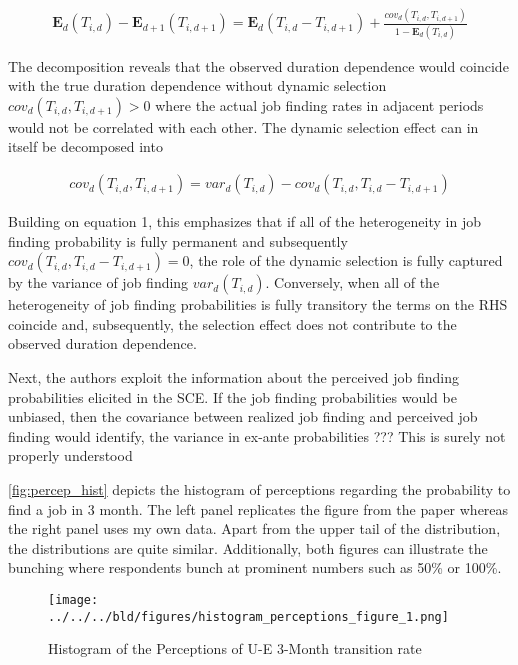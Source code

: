 \documentclass[11pt,a4paper,leqno]{article}
\begin{document}
\begin{align}
	\mathbf{E}_d (T_{i,d}) - \mathbf{E}_{d+1} (T_{i,d+1}) = \mathbf{E}_d (T_{i,d} - T_{i,d+1}) + \frac{cov_d (T_{i,d},T_{i,d+1})}{1 - \mathbf{E}_d (T_{i,d})}
\end{align}

The decomposition reveals that the observed duration dependence would coincide with the true duration dependence without dynamic selection $cov_d (T_{i,d},T_{i,d+1}) > 0$ where the actual  job finding rates in adjacent periods would not be correlated with each other. The dynamic selection effect can in itself be decomposed into 

\begin{align}
	cov_d (T_{i,d},T_{i,d+1}) = var_d (T_{i,d}) -  cov_d (T_{i,d},T_{i,d} - T_{i,d+1})
\end{align}

Building on equation 1, this emphasizes that if all of the heterogeneity in job finding probability is fully permanent  and subsequently $cov_d (T_{i,d},T_{i,d} - T_{i,d+1}) = 0$, the role of the dynamic selection is fully captured by the variance of job finding $var_d (T_{i,d})$. Conversely, when all of the heterogeneity of job finding probabilities is fully transitory the terms on the RHS coincide and, subsequently, the selection effect does not contribute to the observed duration dependence. 

Next, the authors exploit the information about the perceived job finding probabilities elicited in the SCE. If the job finding probabilities would be unbiased, then the covariance between realized job finding and  perceived job finding would identify, the variance in ex-ante probabilities  ??? This is surely not properly understood


\autoref{fig:percep_hist} depicts the histogram of perceptions regarding the probability to find a job in 3 month. The left panel replicates the figure from the paper whereas the right panel uses my own data. Apart from the upper tail of the distribution, the distributions are quite similar. Additionally, both figures can illustrate the bunching where respondents bunch at prominent numbers such as 50\% or 100\%. 

\begin{figure}[!htbp] \centering
	\texttt{[image: ../../../bld/figures/histogram\_perceptions\_figure\_1.png]}
	\caption{Histogram of the Perceptions of U-E 3-Month transition rate}
	\label{fig:percep_hist}
\end{figure}
\end{document}
